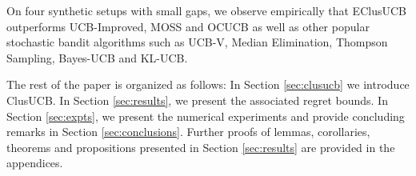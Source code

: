On four synthetic setups with small gaps, we observe empirically that EClusUCB outperforms UCB-Improved\cite{auer2010ucb}, MOSS\cite{audibert2009minimax} and OCUCB\cite{lattimore2015optimally} as well as other popular stochastic bandit algorithms such as UCB-V\cite{audibert2009exploration}, Median Elimination\cite{even2006action}, Thompson Sampling\cite{agrawal2011analysis}, Bayes-UCB\cite{kaufmann2012bayesian} and KL-UCB\cite{garivier2011kl}. 

The rest of the paper is organized as follows: In Section \ref{sec:clusucb} we introduce ClusUCB. In Section \ref{sec:results}, we present the associated regret bounds. In Section \ref{sec:expts}, we present the numerical experiments and provide concluding remarks in Section \ref{sec:conclusions}. Further proofs of lemmas, corollaries, theorems and propositions presented in Section \ref{sec:results}  are provided in the appendices. 


